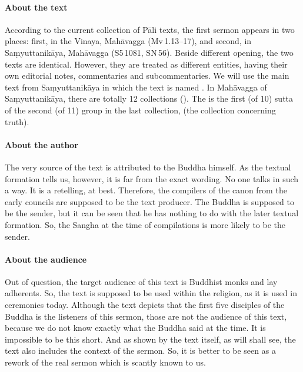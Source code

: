\paragraph*{About the text} According to the current collection of P\=ali texts, the first sermon appears in two places: first, in the Vinaya, Mah\=avagga (Mv\,1.13--17), and second, in Sa\d myuttanik\=aya, Mah\=avagga (S5\,1081, SN\,56). Beside different opening, the two texts are identical. However, they are treated as different entities, having their own editorial notes, commentaries and subcommentaries. We will use the main text from Sa\d myuttanik\=aya in which the text is named . In Mah\=avagga of Sa\d myuttanik\=aya, there are totally 12 collections (). The  is the first (of 10) sutta of the second (of 11) group in the last collection,  (the collection concerning truth).

\paragraph*{About the author} The very source of the text is attributed to the Buddha himself. As the textual formation tells us, however, it is far from the exact wording. No one talks in such a way. It is a retelling, at best. Therefore, the compilers of the canon from the early councils are supposed to be the text producer. The Buddha is supposed to be the sender, but it can be seen that he has nothing to do with the later textual formation. So, the Sangha at the time of compilations is more likely to be the sender.

\paragraph*{About the audience} Out of question, the target audience of this text is Buddhist monks and lay adherents. So, the text is supposed to be used within the religion, as it is used in ceremonies today. Although the text depicts that the first five disciples of the Buddha is the listeners of this sermon, those are not the audience of this text, because we do not know exactly what the Buddha said at the time. It is impossible to be this short. And as shown by the text itself, as will shall see, the text also includes the context of the sermon. So, it is better to be seen as a rework of the real sermon which is scantly known to us.

